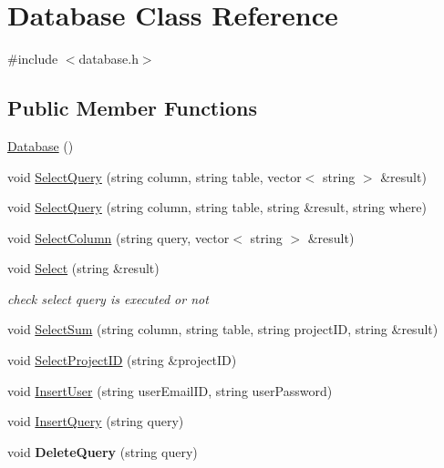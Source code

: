 \hypertarget{classDatabase}{\section{Database Class Reference}
\label{classDatabase}
}


{\ttfamily \#include $<$database.\-h$>$}

\subsection*{Public Member Functions}
\begin{DoxyCompactItemize}
\item 
\hyperlink{classDatabase_a4703c80e6969d33565ea340f768fdadf}{Database} ()
\item 
void \hyperlink{classDatabase_aec3d0f84e49a58a59f254c90193c1303}{Select\-Query} (string column, string table, vector$<$ string $>$ \&result)
\item 
void \hyperlink{classDatabase_a958467134aa40db133cdf6d46ab52c86}{Select\-Query} (string column, string table, string \&result, string where)
\item 
void \hyperlink{classDatabase_a6fb9e249cb97830af86c00804bb209a2}{Select\-Column} (string query, vector$<$ string $>$ \&result)
\item 
void \hyperlink{classDatabase_abdca011c353c6760fc1ad31871ad88bf}{Select} (string \&result)
\begin{DoxyCompactList}\small\item\em check select query is executed or not \end{DoxyCompactList}\item 
void \hyperlink{classDatabase_af237df2de117cf94e23d288ad3345ca0}{Select\-Sum} (string column, string table, string project\-I\-D, string \&result)
\item 
void \hyperlink{classDatabase_a20f7ccadac8f3b67d4344f7da4594eda}{Select\-Project\-I\-D} (string \&project\-I\-D)
\item 
void \hyperlink{classDatabase_a7070d93bf44c5f90504944f54607b9b0}{Insert\-User} (string user\-Email\-I\-D, string user\-Password)
\item 
void \hyperlink{classDatabase_a63d8c1af7507b1dcdc81a411f9a0b4b4}{Insert\-Query} (string query)
\item 
\hypertarget{classDatabase_a1208df2b3a68342b506e952bb2b01b6f}{void {\bfseries Delete\-Query} (string query)}\label{classDatabase_a1208df2b3a68342b506e952bb2b01b6f}


\end{DoxyCompactItemize}
